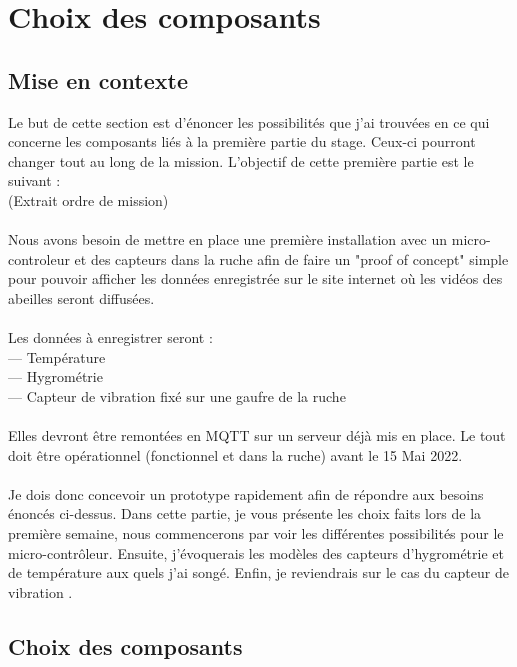 \documentclass[12pt]{article}
\begin{document}
\section{Choix des composants}

\subsection{Mise en contexte}

Le but de cette section est d'énoncer les possibilités que j'ai trouvées en ce qui concerne les composants liés à la première partie du stage. 
Ceux-ci pourront changer tout au long de la mission. L'objectif de cette première partie est le suivant :\\ (Extrait ordre de mission)\\ 
\\
Nous avons besoin de mettre en place une première installation avec un micro-controleur et
des capteurs dans la ruche afin de faire un "proof of concept" simple pour pouvoir afficher les
données enregistrée sur le site internet où les vidéos des abeilles seront diffusées.\\
\\
Les données à enregistrer seront :\\
— Température\\
— Hygrométrie\\
— Capteur de vibration fixé sur une gaufre de la ruche\\
\\
Elles devront être remontées en MQTT sur un serveur déjà mis en place.
Le tout doit être opérationnel (fonctionnel et dans la ruche) avant le 15 Mai 2022.
\\
\\
Je dois donc concevoir un prototype rapidement afin de répondre aux besoins énoncés ci-dessus.
Dans cette partie, je vous présente les choix faits lors de la première semaine, nous commencerons par voir les différentes
possibilités pour le micro-contrôleur. Ensuite, j'évoquerais les modèles des capteurs d'hygrométrie et de température aux quels j'ai songé.
Enfin, je reviendrais sur le cas du capteur de vibration .

\subsection{Choix des composants}
\end{document}
